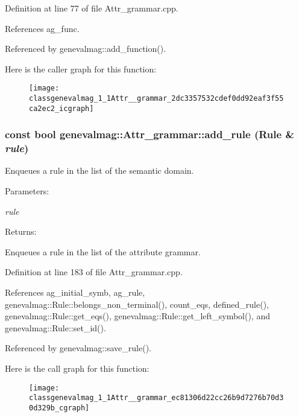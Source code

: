 Definition at line 77 of file Attr\_\-grammar.cpp.

References ag\_\-func.

Referenced by genevalmag::add\_\-function().

Here is the caller graph for this function:\nopagebreak
\begin{figure}[H]
\begin{center}
\leavevmode
\texttt{[image: classgenevalmag\_1\_1Attr\_\_grammar\_2dc3357532cdef0dd92eaf3f55ca2ec2\_icgraph]}
\end{center}
\end{figure}
\hypertarget{classgenevalmag_1_1Attr__grammar_ec81306d22cc26b9d7276b70d30d329b}{
\subsubsection[{add\_\-rule}]{\setlength{\rightskip}{0pt plus 5cm}const bool genevalmag::Attr\_\-grammar::add\_\-rule ({\bf Rule} \& {\em rule})}}
\label{classgenevalmag_1_1Attr__grammar_ec81306d22cc26b9d7276b70d30d329b}


Enqueues a rule in the list of the semantic domain. \begin{Desc}
\item[Parameters:]
\begin{description}
\item[{\em rule}]\end{description}
\end{Desc}
\begin{Desc}
\item[Returns:]\end{Desc}
Enqueues a rule in the list of the attribute grammar. 

Definition at line 183 of file Attr\_\-grammar.cpp.

References ag\_\-initial\_\-symb, ag\_\-rule, genevalmag::Rule::belongs\_\-non\_\-terminal(), count\_\-eqs, defined\_\-rule(), genevalmag::Rule::get\_\-eqs(), genevalmag::Rule::get\_\-left\_\-symbol(), and genevalmag::Rule::set\_\-id().

Referenced by genevalmag::save\_\-rule().

Here is the call graph for this function:\nopagebreak
\begin{figure}[H]
\begin{center}
\leavevmode
\texttt{[image: classgenevalmag\_1\_1Attr\_\_grammar\_ec81306d22cc26b9d7276b70d30d329b\_cgraph]}
\end{center}
\end{figure}


